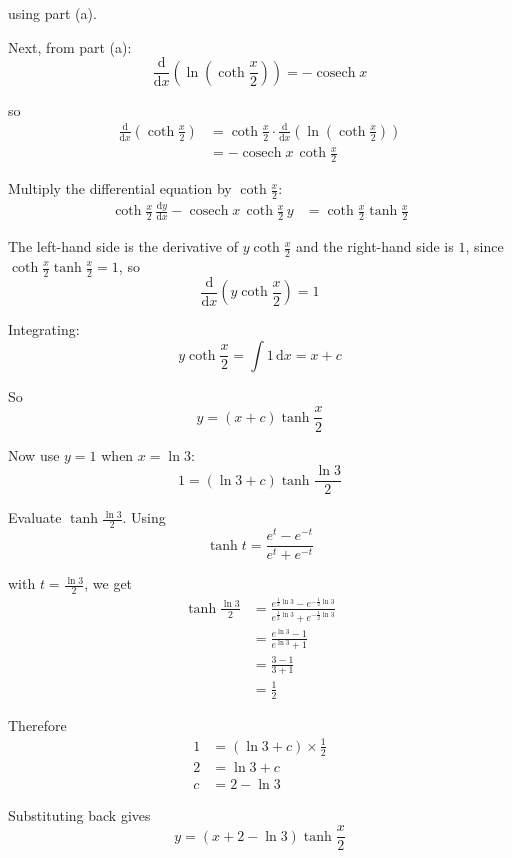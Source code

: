 \documentclass[leqno]{article}
\begin{document}
\begin{enumerate}[
  label=\textbf{\arabic*.},
  leftmargin=*,
  topsep=0pt,
  partopsep=0pt,
  parsep=0pt
]
\begin{djsSolution}
\begin{enumerate}[label=\textbf{(\alph*)}]
using part (a).

Next, from part (a):
\[
\frac{\mathrm{d}}{\mathrm{d}x}\left(\ln\left(\coth \frac{x}{2}\right)\right)=-\operatorname{cosech} x
\]

so
\begin{align*}
\frac{\mathrm{d}}{\mathrm{d}x}\left(\coth \frac{x}{2}\right)
&= \coth \frac{x}{2}\cdot \frac{\mathrm{d}}{\mathrm{d}x}\left(\ln\left(\coth \frac{x}{2}\right)\right) \\
&= -\operatorname{cosech} x\,\coth \frac{x}{2}
\end{align*}

Multiply the differential equation by \(\coth \frac{x}{2}\):
\begin{align*}
\coth \frac{x}{2}\,\frac{\mathrm{d}y}{\mathrm{d}x}
-\operatorname{cosech} x\,\coth \frac{x}{2}\,y
&= \coth \frac{x}{2}\tanh \frac{x}{2}
\end{align*}

The left-hand side is the derivative of \(y\coth \frac{x}{2}\) and the right-hand side is \(1\), since \(\coth \frac{x}{2}\tanh \frac{x}{2}=1\), so
\[
\frac{\mathrm{d}}{\mathrm{d}x}\left(y\coth \frac{x}{2}\right)=1
\]

Integrating:
\[
y\coth \frac{x}{2}=\int 1\,\mathrm{d}x=x+c
\]

So
\[
y=(x+c)\tanh \frac{x}{2}
\]

Now use \(y=1\) when \(x=\ln 3\):
\[
1=(\ln 3+c)\tanh \frac{\ln 3}{2}
\]

Evaluate \(\tanh \frac{\ln 3}{2}\). Using
\[
\tanh t=\frac{e^t-e^{-t}}{e^t+e^{-t}}
\]

with \(t=\frac{\ln 3}{2}\), we get
\begin{align*}
\tanh \frac{\ln 3}{2}
&= \frac{e^{\frac{1}{2}\ln 3}-e^{-\frac{1}{2}\ln 3}}{e^{\frac{1}{2}\ln 3}+e^{-\frac{1}{2}\ln 3}} \\
&= \frac{e^{\ln 3}-1}{e^{\ln 3}+1} \\
&= \frac{3-1}{3+1} \\
&= \frac{1}{2}
\end{align*}

Therefore
\begin{align*}
1&=(\ln 3+c)\times \frac{1}{2} \\
2&=\ln 3+c \\
c&=2-\ln 3
\end{align*}

Substituting back gives
\[
y=(x+2-\ln 3)\tanh \frac{x}{2}
\]
\end{enumerate}
\end{djsSolution}



\end{enumerate}
\end{document}
